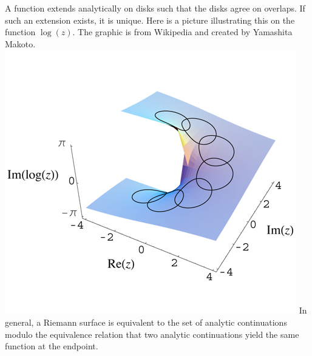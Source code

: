 \documentclass[11pt,leqno,oneside]{amsart}
\numberwithin{thm}{section}
\begin{document}
  A function extends analytically on disks such that the disks agree
  on overlaps. If such an extension exists, it is unique. Here is a
  picture illustrating this on the function $\log(z)$. The graphic is
  from Wikipedia and created by Yamashita Makoto. \\
  \includegraphics{Imaginary_log_analytic_continuation.png}
  In general, a Riemann surface is equivalent to the set of analytic
  continuations modulo the equivalence relation that two analytic
  continuations yield the same function at the endpoint.
\end{document}

